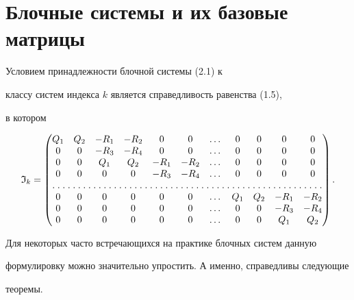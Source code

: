  


\section{Блочные системы и их базовые матрицы} 


 


Условием принадлежности блочной системы (2.1) к 


классу систем индекса $k$ является справедливость равенства (1.5), 


в котором 


\begin{equation} 


\setcounter{MaxMatrixCols}{11} 


\frak I_k= 


\begin{pmatrix} 


Q_1 & Q_2 & -R_1 & -R_2 & 0 & 0 & \dotsc & 0 & 0 & 0 & 0 \\ 


0 & 0 & -R_3 & -R_4 & 0 & 0 & \dotsc & 0 & 0 & 0 & 0 \\ 


0 & 0 & Q_1 & Q_2 & -R_1 & -R_2 & \dotsc & 0 & 0 & 0 & 0 \\ 


0 & 0 & 0 & 0 & -R_3 & -R_4 & \dotsc & 0 & 0 & 0 & 0 \\ 


\hdotsfor[1.5]{11} \\


0 & 0 & 0 & 0 & 0 & 0 & \dotsc & Q_1 & Q_2 & -R_1 & -R_2 \\ 


0 & 0 & 0 & 0 & 0 & 0 & \dotsc & 0 & 0 & -R_3 & -R_4 \\ 


0 & 0 & 0 & 0 & 0 & 0 & \dotsc & 0 & 0 & Q_1 & Q_2 


\end{pmatrix} 


. 


\end{equation} 


 


Для некоторых часто встречающихся на практике блочных систем данную 


формулировку можно значительно упростить. А именно, справедливы следующие 


теоремы. 


